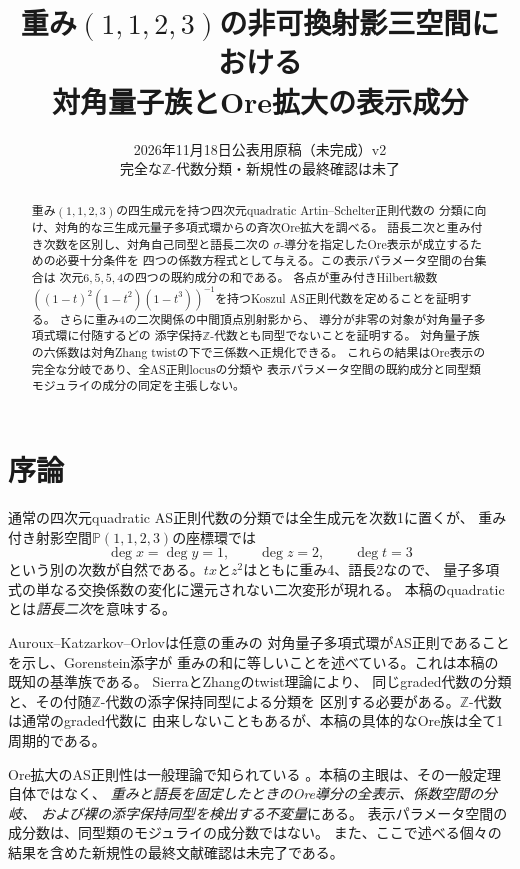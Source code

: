 \documentclass[11pt,a4paper]{ltjsarticle}
\title{重み$(1,1,2,3)$の非可換射影三空間における\\
対角量子族とOre拡大の表示成分}
\author{}
\date{2026年11月18日\quad 公表用原稿（未完成）v2\\
\small 完全な$\mathbb Z$-代数分類・新規性の最終確認は未了}
\theoremstyle{definition}
\begin{document}
\maketitle
\begin{abstract}
重み$(1,1,2,3)$の四生成元を持つ四次元quadratic Artin--Schelter正則代数の
分類に向け、対角的な三生成元量子多項式環からの斉次Ore拡大を調べる。
語長二次と重み付き次数を区別し、対角自己同型と語長二次の
$\sigma$-導分を指定したOre表示が成立するための必要十分条件を
四つの係数方程式として与える。この表示パラメータ空間の台集合は
次元$6,5,5,4$の四つの既約成分の和である。
各点が重み付きHilbert級数
$((1-t)^2(1-t^2)(1-t^3))^{-1}$を持つKoszul AS正則代数を定めることを証明する。
さらに重み4の二次関係の中間頂点別射影から、
導分が非零の対象が対角量子多項式環に付随するどの
添字保持$\mathbb Z$-代数とも同型でないことを証明する。
対角量子族の六係数は対角Zhang twistの下で三係数へ正規化できる。
これらの結果はOre表示の完全な分岐であり、全AS正則locusの分類や
表示パラメータ空間の既約成分と同型類モジュライの成分の同定を主張しない。
\end{abstract}

\section{序論}
通常の四次元quadratic AS正則代数の分類では全生成元を次数1に置くが、
重み付き射影空間$\mathbb P(1,1,2,3)$の座標環では
\[
\deg x=\deg y=1,\qquad\deg z=2,\qquad\deg t=3
\]
という別の次数が自然である。$tx$と$z^2$はともに重み4、語長2なので、
量子多項式の単なる交換係数の変化に還元されない二次変形が現れる。
本稿のquadraticとは\emph{語長二次}を意味する。

Auroux--Katzarkov--Orlov\cite[Proposition~2.6]{AKO}は任意の重みの
対角量子多項式環がAS正則であることを示し、Gorenstein添字が
重みの和に等しいことを述べている。これは本稿の既知の基準族である。
Sierra\cite[Theorem~1.2]{Sierra}とZhang\cite{Zhang}のtwist理論により、
同じgraded代数の分類と、その付随$\mathbb Z$-代数の添字保持同型による分類を
区別する必要がある。$\mathbb Z$-代数は通常のgraded代数に
由来しないこともあるが、本稿の具体的なOre族は全て1周期的である。

Ore拡大のAS正則性は一般理論で知られている
\cite[Theorem~3.3]{LWW}。本稿の主眼は、その一般定理自体ではなく、
\emph{重みと語長を固定したときのOre導分の全表示、係数空間の分岐、
および裸の添字保持同型を検出する不変量}にある。
表示パラメータ空間の成分数は、同型類のモジュライの成分数ではない。
また、ここで述べる個々の結果を含めた新規性の最終文献確認は未完了である。
\end{document}

